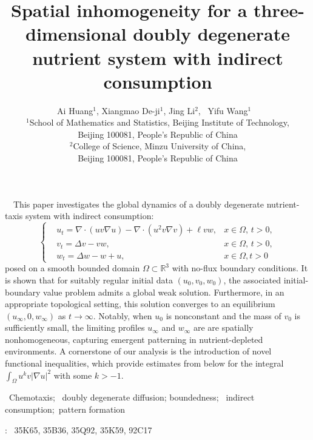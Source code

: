 \documentclass[12pt]{article}
\theoremstyle{plain}
\theoremstyle{definition}
\numberwithin{equation}{section}
\begin{document}
\title{Spatial inhomogeneity for a three-dimensional doubly degenerate nutrient system with indirect consumption  }
\author{Ai Huang$^{1}$, Xiangmao De-ji$^{1}$, Jing Li$^{2}$, \ Yifu Wang$^{1}$ \ \\[2mm]
 { \small $^{1}$School of Mathematics and Statistics, Beijing Institute of Technology,}\\
  { \small Beijing 100081, People's Republic of China}\\
 { \small $^{2}$College of Science, Minzu University of China,}\\
  { \small Beijing 100081, People's Republic of China}}
         \date{}
         \maketitle
{}\ \ This paper investigates the global dynamics of a doubly degenerate nutrient-taxis system with indirect consumption:
\begin{equation*}
\left\{
\begin{aligned}
&u_{t}=\nabla \cdot (uv\nabla u)-\nabla \cdot (u^{2}v\nabla v)+\ell vw,&x\in \Omega,\, t>0,\\
& v_{t}=\Delta v-vw,&x\in \Omega,\, t>0,\\
&w_t=\Delta w-w+u,&x\in\Omega,t>0
\end{aligned}
\right.
\end{equation*}
posed on a smooth bounded domain $\Omega\subset\mathbb{R}^{3}$  with no-flux boundary conditions.
 It is shown that
   for suitably regular initial data $(u_0,v_0,w_0)$, the associated initial-boundary value problem admits a global weak solution.
   Furthermore, in an appropriate topological setting, this solution converges to an equilibrium $(u_\infty, 0,w_\infty)$ as $t\rightarrow \infty$. Notably, when $u_0$ is nonconstant and the mass of $
   v_0$ is sufficiently small, the limiting  profiles $u_{\infty}$ and $w_{\infty}$ are  are spatially nonhomogeneous,
      capturing emergent patterning in nutrient-depleted environments.
    A cornerstone of our analysis is the introduction of novel functional inequalities,
       which  provide estimates from below for the integral $\int_{\Omega}u^{k}v|\nabla u|^2$ with some $k>-1$.

  \ Chemotaxis; \ doubly degenerate diffusion;  boundedness; \ indirect consumption;\ pattern formation

:~ 35K65, 35B36, 35Q92, 35K59, 92C17
\vskip   0.2cm  \setlength{\baselineskip}{20pt}
\end{document}
